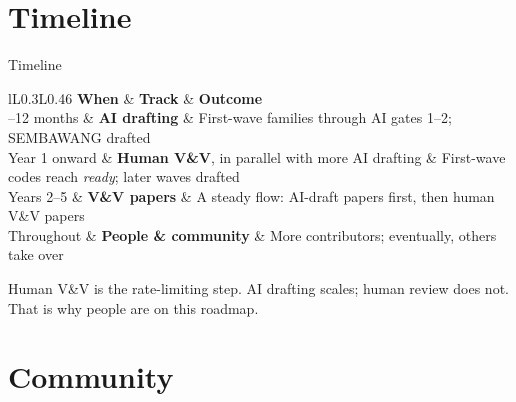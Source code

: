 \documentclass[aspectratio=169]{beamer}
\newcommand{\roadtab}[1]{{\footnotesize\setlength{\tabcolsep}{4pt}#1}}
\begin{document}
\section{Timeline}

\begin{frame}{Timeline}
    \roadtab{
    \begin{tabular}{lL{0.3\textwidth}L{0.46\textwidth}}
        \toprule
        \textbf{When} & \textbf{Track} & \textbf{Outcome} \\
        \midrule
        0--12 months   & \textbf{AI drafting} & First-wave families through
            AI gates 1--2; SEMBAWANG drafted \\[2pt]
        Year 1 onward  & \textbf{Human V\&V}, in parallel with more AI
                         drafting & First-wave codes reach \emph{ready};
            later waves drafted \\[2pt]
        Years 2--5     & \textbf{V\&V papers} & A steady flow: AI-draft
            papers first, then human V\&V papers \\[2pt]
        Throughout     & \textbf{People \& community} & More contributors;
            eventually, others take over \\
        \bottomrule
    \end{tabular}}

    \medskip
    \footnotesize
    Human V\&V is the rate-limiting step. AI drafting scales; human review
    does not. That is why people are on this roadmap.
\end{frame}


\section{Community}
\end{document}
